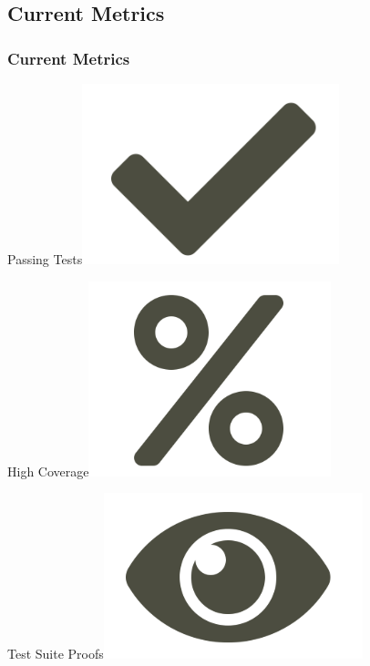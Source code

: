 \subsection{Current Metrics}
\begin{frame}
	\frametitle{Current Metrics}
		\huge{Passing Tests}\hfill\includegraphics[scale = 0.25]{images/check.png}

		\huge{High Coverage}\hfill\includegraphics[scale = 0.23]{images/percent.png}

		\huge{Test Suite Proofs}\hfill\includegraphics[scale = 0.25]{images/eye.png}
\end{frame}


